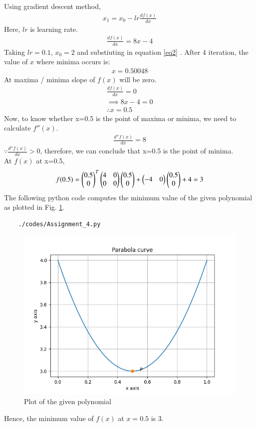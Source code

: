 \documentclass[journal,12pt,twocolumn]{IEEEtran}
\begin{document}
    Using gradient descent method,
    \begin{align}
    x_1=x_0-lr\frac{df(x)}{dx} \label{eq2}
    \end{align}
    Here, $lr$ is learning rate.\\
    \begin{align}
    \frac{df(x)}{dx}=8x-4
\end{align}
    Taking $lr=0.1$, $x_0=2$ and substiuting in equation \ref{eq2} . After 4 iteration, the value of $x$ where minima occurs is:
    \begin{align}
    x=0.50048
    \end{align}
At maxima / minima slope of $f(x)$ will be zero.
\begin{align}
    \frac{df(x)}{dx}=0\\
	\implies 8x-4=0\\
    \therefore x=0.5
\end{align}
Now, to know whether x=0.5 is the point of maxima or minima, we need to calculate $f''(x)$.
\begin{align}
    \frac{d''f(x)}{dx}=8
\end{align}
$\because   \frac{d''f(x)}{dx}>0$, therefore,  we can conclude that x=0.5 is the point of minima.\\
At $f(x)$ at x=0.5,
\begin{align}
    f(0.5)=\begin{pmatrix}0.5\\0\end{pmatrix}^T\begin{pmatrix}4&0\\0&0\end{pmatrix}\begin{pmatrix}0.5\\0\end{pmatrix}  + \begin{pmatrix}-4&0\end{pmatrix}\begin{pmatrix}0.5\\0\end{pmatrix} +4 = 3
\end{align}
The following python code computes the minimum value of the given polynomial as plotted in Fig. \ref{fig:5.1}.
	\begin{lstlisting}
	./codes/Assignment_4.py
	\end{lstlisting}
	\begin{figure}[!ht]
	\centering
	\includegraphics[width=\columnwidth]{Figure_1.png}
	\caption{Plot of the given polynomial}
	\label{fig:5.1}	
	\end{figure}
Hence, the minimum value of $f(x)$ at $x=0.5$ is 3.
\end{document}
